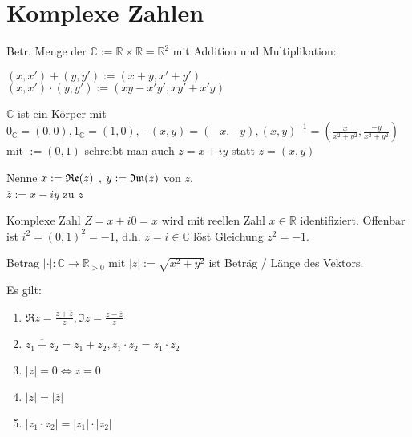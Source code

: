 \section{Komplexe Zahlen}
\begin{definition}
	Betr. Menge der  $\mathbb{C}:=\mathbb{R}\times\mathbb{R} = \mathbb{R}^2$ mit Addition und Multiplikation:
	
	$(x,x') + (y,y') := (x+y, x'+y')$\\
	$(x,x')\cdot(y,y') :=(xy - x'y', xy' + x'y)$
	
	$\mathbb{C}$ ist ein Körper mit $0_\mathbb{C} = (0,0), 1_\mathbb{C} = (1,0), -(x,y)= (-x,-y), (x,y)^{-1} = \left(\frac{x}{x^2 + y^2}, \frac{-y}{x^2 + y^2}\right)$ mit $:=(0,1)$ schreibt man auch $z=x+iy$ statt $z = (x,y)$
	
	Nenne $x:=\mathfrak{Re}(z)$ , $y:=\mathfrak{Im}(z)$  von $z$.\\
	$\overline{z}:= x - iy$ zu $z$ 
	
	Komplexe Zahl $Z = x+i0 = x$ wird mit reellen Zahl $x\in\mathbb{R}$ identifiziert. Offenbar ist $i^2 = (0,1)^2 = -1$, d.h. $z = i\in\mathbb{C}$ löst Gleichung $z^2 = -1$.
	
	Betrag $\vert\cdot\vert:\mathbb{C}\rightarrow \mathbb{R}_{>0}$ mit $\vert z\vert :=\sqrt{x^2 + y^2}$ ist Beträg / Länge des Vektors.
	
	Es gilt:
	\begin{enumerate}[label={\alph*)}]
		\item $\Re z = \frac{z+\overline{z}}{z}, \Im z = \frac{z - \overline{z}}{z}$
		\item $\overline{z_1 + z_2} = \overline{z_1} + \overline{z_2}, \overline{z_1 \cdot z_2} = \overline{z_1}\cdot \overline{z_2}$
		\item $|z| = 0 \Leftrightarrow z = 0$
		\item $|z | = |\overline{z}|$
		\item $|z_1 \cdot z_2 | = |z_1| \cdot |z_2|$
	\end{enumerate}
\end{definition}
